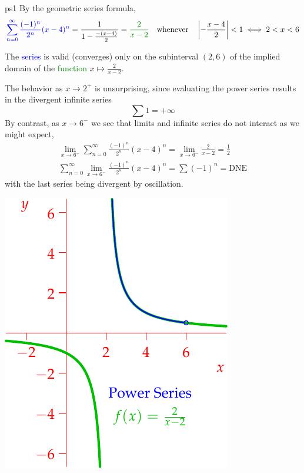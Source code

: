 \begin{example}{}{ps1}
	By the geometric series formula,
	\begin{gather*}\label{ex:bob}
		\textcolor{blue}{\sum_{n=0}^\infty \frac{(-1)^n}{2^n}(x-4)^n}=\frac 1{1-\frac{-(x-4)}2} 
		=\textcolor{Green}{\frac 2{x-2}} \quad
		\text{whenever}\quad\nm{-\frac{x-4}2}<1\iff 2<x<6
	\end{gather*}
	\begin{minipage}[t]{0.62\linewidth}\vspace{0pt}
	The \textcolor{blue}{series} is valid (converges) only on the subinterval $(2,6)$ of the implied domain of the \textcolor{Green}{function} $x\mapsto \frac 2{x-2}$.\par
	The behavior as $x\to 2^+$ is unsurprising, since evaluating the power series results in the divergent infinite series
	\[
		\sum 1=+\infty
	\]
	By contrast, as $x\to 6^-$ we see that limits and infinite series do not interact as we might expect,
	\begin{gather*}
		\lim\limits_{x\to 6^-}\sum_{n=0}^\infty \frac{(-1)^n}{2^n}(x-4)^n=\lim\limits_{x\to 6^-}\frac 2{x-2}=\frac 12\\
		\sum_{n=0}^\infty \lim\limits_{x\to 6^-}\frac{(-1)^n}{2^n}(x-4)^n =\sum (-1)^n =\text{DNE}
	\end{gather*}
	with the last series being divergent by oscillation.
	\end{minipage}
	\hfill
	\begin{minipage}[t]{0.37\linewidth}\vspace{0pt}
		\flushright\includegraphics[scale=0.95]{powerseriesex}
	\end{minipage}
\end{example}

